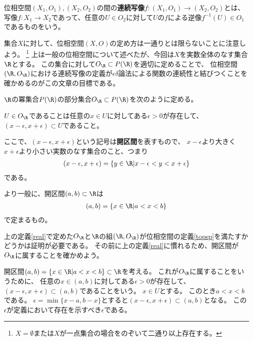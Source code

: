 \documentclass[uplatex]{jsarticle}
\begin{document}
\begin{dfn}[位相空間の間の連続写像]\label{topsp}
  位相空間$(X_1,O_1), (X_2,O_2)$の間の\textbf{連続写像}$f:(X_1,O_1)\to(X_2,O_2)$とは、
  写像$f:X_1\to X_2$であって、任意の$U\in O_2$に対して$U$の$f$による逆像$f^{-1}(U)\in O_1$であるものをいう。
\end{dfn}

集合$X$に対して、位相空間$(X,O)$の定め方は一通りとは限らないことに注意しよう。
\footnote{$X=\emptyset$または$X$が一点集合の場合をのぞいて二通り以上存在する。}
上は一般の位相空間について述べたが、今回は$X$を実数全体のなす集合$\R$とする。
この集合に対して$O_\R\subset P(\R)$を適切に定めることで、
位相空間$(\R,O_\R)$における連続写像の定義が$\epsilon\delta$論法による関数の連続性と結びつくことを確かめるのがこの文章の目標である。

\begin{dfn}[実数の位相]\label{real}
  $\R$の冪集合$P(\R)$の部分集合$O_\R\subset P(\R)$を次のように定める。
  
  $U\in O_\R$であることは任意の$x\in U$に対してある$\epsilon>0$が存在して、
  $(x-\epsilon,x+\epsilon)\subset U$であること。
\end{dfn}

ここで、$(x-\epsilon,x+\epsilon)$という記号は\textbf{開区間}を表すもので、
$x-\epsilon$より大きく$x+\epsilon$より小さい実数のなす集合のこと、つまり
\begin{align*}
  (x-\epsilon,x+\epsilon)=\{y\in\R\vert x-\epsilon<y<x+\epsilon\}
\end{align*}
である。

より一般に、開区間$(a,b)\subset\R$は
\begin{align*}
  (a,b)=\{x\in\R\vert a<x<b\}
\end{align*}
で定まるもの。

上の定義\ref{real}で定めた$O_\R$と$\R$の組$(\R,O_\R)$が位相空間の定義\ref{topsp}を満たすかどうかは証明が必要である。
その前に上の定義\ref{real}に慣れるため、開区間が$O_\R$に属することを確かめよう。

\begin{eg}
  開区間$(a,b)=\{x\in\R\vert a<x<b\}\subset\R$を考える。
  これが$O_\R$に属することをいうために、
  任意の$x\in (a,b)$に対してある$\epsilon>0$が存在して、$(x-\epsilon,x+\epsilon)\subset(a,b)$であることをいう。
  $x\in U$とする。
  このとき$a<x<b$である。
  $\epsilon=\min\{x-a,b-x\}$とすると$(x-\epsilon,x+\epsilon)\subset(a,b)$となる。
  この$\epsilon$が定義において存在を示すべき$\epsilon$である。
\end{eg}
\end{document}
